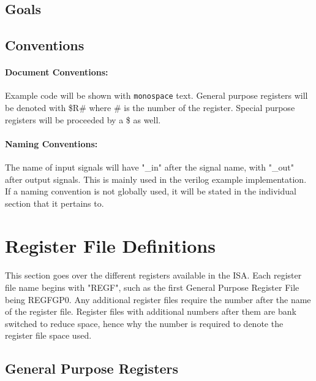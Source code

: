 \documentclass[letterpaper, 11pt]{article}
\begin{document}
\subsection{Goals}
\subsection{Conventions}
\paragraph{Document Conventions:}Example code will be shown with \texttt{monospace} text. General purpose registers will be denoted with
\$R\# where \# is the number of the register. Special purpose registers will be proceeded by a \$ as well.
\paragraph{Naming Conventions:}The name of input signals will have "\_in" after the signal name, with "\_out" after output signals.
This is mainly used in the verilog example implementation. If a naming convention is not globally used, it will be stated in the individual section that it pertains to. 


\section{Register File Definitions}
\paragraph{}This section goes over the different registers available in the ISA. Each register file name begins with 
"REGF", such as the first General Purpose Register File being REGFGP0. Any additional register files require the number after the
name of the register file. Register files with additional numbers after them are bank switched to reduce space, hence why the number is
required to denote the register file space used.
\subsection{General Purpose Registers}
\end{document}
